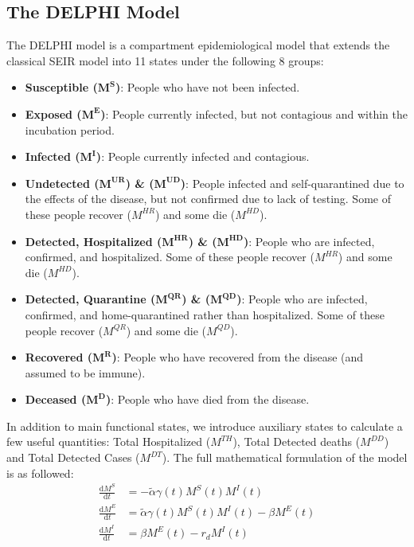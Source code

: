 \documentclass[msom,blindrev]{informs3} %
\begin{document}
\begin{APPENDICES}
\section{The DELPHI Model}
\label{app:delphi_fitting_procedure}
The DELPHI model is a compartment epidemiological model that extends the classical SEIR model into 11 states under the following 8 groups:
\begin{itemize}[topsep=0pt,itemsep=0pt]
    \item \textbf{Susceptible ($\bm{M^S}$)}: People who have not been infected.
    \item \textbf{Exposed ($\bm{M^E}$)}: People currently infected, but not contagious and within the incubation period. 
    \item \textbf{Infected ($\bm{M^I}$)}: People currently infected and contagious. 
    \item \textbf{Undetected ($\bm{M^{UR}}$) \& ($\bm{M^{UD}}$)}: People infected and self-quarantined due to the effects of the disease, but not confirmed due to lack of testing. Some of these people recover ($M^{HR}$) and some die ($M^{HD}$).
    \item \textbf{Detected, Hospitalized ($\bm{M^{HR}}$) \& ($\bm{M^{HD}}$)}: People who are infected, confirmed, and hospitalized. Some of these people recover ($M^{HR}$) and some die ($M^{HD}$).
    \item \textbf{Detected, Quarantine ($\bm{M^{QR}}$) \& ($\bm{M^{QD}}$)}: People who are infected, confirmed, and home-quarantined rather than hospitalized. Some of these people recover ($M^{QR}$) and some die ($M^{QD}$).
    \item \textbf{Recovered ($\bm{M^{R}}$)}: People who have recovered from the disease (and assumed to be immune).
    \item \textbf{Deceased ($\bm{M^{D}}$)}:  People who have died from the disease. 
 \end{itemize}
In addition to main functional states, we introduce auxiliary states to calculate a few useful quantities: Total Hospitalized ($M^{TH}$), Total Detected deaths ($M^{DD}$) and Total Detected Cases ($M^{DT}$). The full mathematical formulation of the model is as followed:
\begin{align*}
\frac{\mathrm{d} M^S}{\mathrm{d} t} &= -\widetilde{\alpha} \gamma(t)M^S(t)M^I(t) \\
\frac{\mathrm{d} M^E}{\mathrm{d} t} &= \widetilde{\alpha} \gamma(t)M^S(t)M^I(t)-\beta M^E(t) \\
\frac{\mathrm{d} M^I}{\mathrm{d} t} &= \beta M^E(t)-r_d M^I(t) \\

\end{align*}
\end{APPENDICES}
\end{document}
